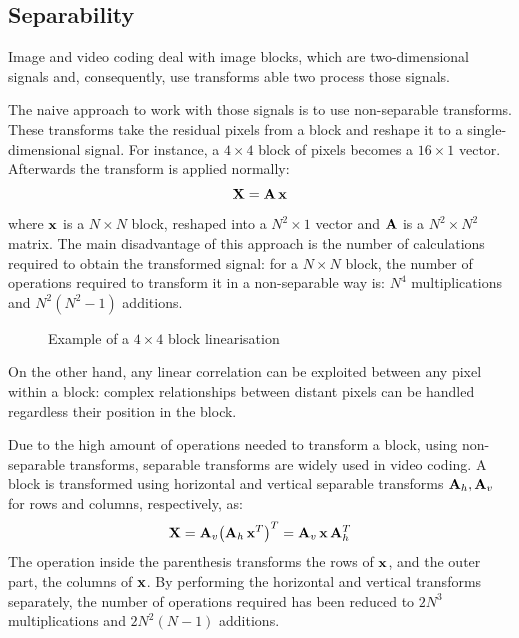 \documentclass[11pt,a4paper,openright,twoside]{book}
\numberwithin{equation}{section} %
\numberwithin{figure}{section} %
\numberwithin{table}{section} %
\begin{document}
\subsection{Separability}
\label{sub:separability}

Image and video coding deal with image blocks, which are two-dimensional
signals and, consequently, use transforms able two process those
signals.

The naive approach to work with those signals is to use non-separable
transforms.
These transforms take the residual pixels from a block and reshape it to a
single-dimensional signal. For instance, a $4\times4$ block of pixels becomes a
$16\times1$ vector.
Afterwards the transform is applied normally:
\begin{equation}
	\mathbf{X} = \mathbf{A} \, \mathbf{x}
\end{equation}
where $\mathbf{x}$ is a $N \times N$ block, reshaped into a $N^2\times1$ vector
and $\mathbf{A}$ is a $N^2 \times N^2$ matrix.
The main disadvantage of this approach is the number of calculations
required to obtain the transformed signal: for a $N \times N$ block, the
number of operations required to transform it in a non-separable way is:
$N^4$ multiplications and $N^2(N^2-1)$ additions.

\begin{figure}[tb]
	\centering
	
	\caption{Example of a $4\times4$ block linearisation}
	\label{fig:block_linearisation}
\end{figure}

On the other hand, any linear correlation can be exploited between any pixel
within a block:
complex relationships between distant pixels can be handled regardless their
position in the block.

Due to the high amount of operations needed to transform a block, using
non-separable transforms, separable transforms are widely used in video
coding.
A block is transformed using horizontal and vertical separable transforms
$\mathbf{A}_h, \mathbf{A}_v$ for rows and columns, respectively, as:
\begin{equation}
	\mathbf{X} = \mathbf{A}_v {\left(\mathbf{A}_h \, \mathbf{x}^T\right)}^T = \mathbf{A}_v \, \mathbf{x} \, \mathbf{A}_h^T
	\label{eqn:sep_transform}
\end{equation}
The operation inside the parenthesis transforms the rows of $\mathbf{x}$, and
the outer part, the columns of $\mathbf{x}$.
By performing the horizontal and vertical transforms separately, the
number of operations required has been reduced to $2N^3$ multiplications
and $2N^2(N-1)$ additions.
\end{document}

